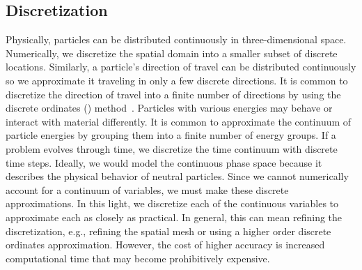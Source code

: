\documentclass[12pt,letterpaper]{article}
\begin{document}
\subsection{Discretization}
\label{sec:DiscretizationIntro}
Physically, particles can be distributed continuously in three-dimensional space. Numerically, we discretize the spatial domain into a smaller subset of discrete locations. Similarly, a particle's direction of travel can be distributed continuously so we approximate it traveling in only a few discrete directions. It is common to discretize the direction of travel into a finite number of directions by using the discrete ordinates (\SN) method~\cite{discrete_ordinates}. Particles with various energies may behave or interact with material differently. It is common to approximate the continuum of particle energies by grouping them into a finite number of energy groups. If a problem evolves through time, we discretize the time continuum with discrete time steps. Ideally, we would model the continuous phase space because it describes the physical behavior of neutral particles. Since we cannot numerically account for a continuum of variables, we must make these discrete approximations. In this light, we discretize each of the continuous variables to approximate each as closely as practical. In general, this can mean refining the discretization, e.g., refining the spatial mesh or using a higher order discrete ordinates approximation. However, the cost of higher accuracy is increased computational time that may become prohibitively expensive.
\end{document}
